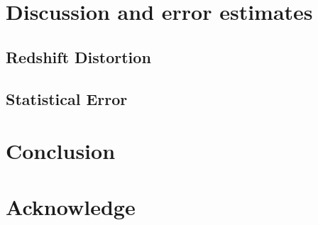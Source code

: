 \documentclass[aps,prd,twocolumn,showpacs,superscriptaddress,groupedaddress,nofootinbib]{revtex4}  %
\begin{document}
\section{Discussion and error estimates}
\subsection{Redshift Distortion}

\subsection{Statistical Error}

\section{Conclusion}
\section{Acknowledge}



\end{document}
